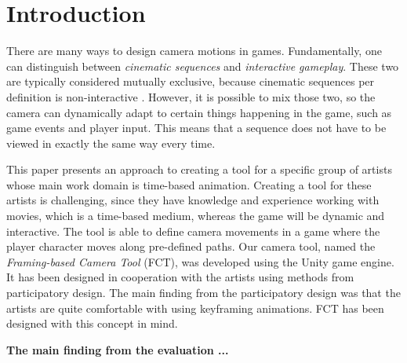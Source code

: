 \section{Introduction}


There are many ways to design camera motions in games. Fundamentally, one can distinguish between \textit{cinematic sequences} and \textit{interactive gameplay}. These two are typically considered mutually exclusive, because cinematic sequences per definition is non-interactive \cite{haigh-hutchinson_real-time_2009}. However, it is possible to mix those two, so the camera can dynamically adapt to certain things happening in the game, such as game events and player input. This means that a sequence does not have to be viewed in exactly the same way every time.

This paper presents an approach to creating a tool for a specific group of artists whose main work domain is time-based animation. Creating a tool for these artists is challenging, since they have knowledge and experience working with movies, which is a time-based medium, whereas the game will be dynamic and interactive.  The tool is able to define camera movements in a game where the player character moves along pre-defined paths. Our camera tool, named the \textit{Framing-based Camera Tool} (FCT), was developed using the Unity game engine. It has been designed in cooperation with the artists using methods from participatory design. The main finding from the participatory design was that the artists are quite comfortable with using keyframing animations. FCT has been designed with this concept in mind.

\textbf{The main finding from the evaluation ...}


